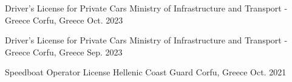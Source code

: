 


\begin{cventries}

  \cventry
    {Driver's License for Private Cars} %
    {Ministry of Infrastructure and Transport - Greece} %
    {Corfu, Greece} %
    {Oct. 2023} %
    {
      \begin{cvitems} %
      \end{cvitems}
    }


  \cventry
    {Driver's License for Private Cars} %
    {Ministry of Infrastructure and Transport - Greece} %
    {Corfu, Greece} %
    {Sep. 2023} %
    {
      \begin{cvitems} %
      \end{cvitems}
    }


  \cventry
    {Speedboat Operator License} %
    {Hellenic Coast Guard} %
    {Corfu, Greece} %
    {Oct. 2021} %
    {
      \begin{cvitems} %
      \end{cvitems}
    }


\end{cventries}
